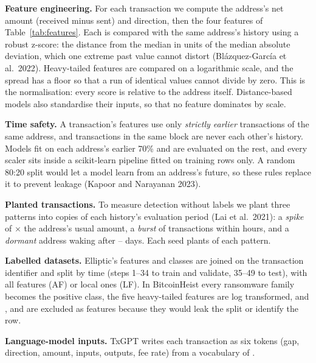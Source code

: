 \textbf{Feature engineering.} For each transaction we compute the address's net amount (received minus sent) and
direction, then the four features of Table~\ref{tab:features}. Each is compared with the same address's history
using a robust z-score: the distance from the median in units of the median absolute deviation, which one
extreme past value cannot distort (Blázquez-García et al.\ 2022). Heavy-tailed features are compared on a
logarithmic scale, and the spread has a floor so that a run of identical values cannot divide by zero. This is
the normalisation: every score is relative to the address itself. Distance-based models also standardise their
inputs, so that no feature dominates by scale.



\textbf{Time safety.} A transaction's features use only \emph{strictly earlier} transactions of the same address,
and transactions in the same block are never each other's history. Models fit on each address's earlier 70\% and
are evaluated on the rest, and every scaler sits inside a scikit-learn pipeline fitted on training rows only. A
random 80:20 split would let a model learn from an address's future, so these rules replace it to prevent leakage
(Kapoor and Narayanan 2023).

\textbf{Planted transactions.} To measure detection without labels we plant three patterns into copies of each
history's evaluation period (Lai et al.\ 2021): a \emph{spike} of $\times$ the address's usual amount,
a \emph{burst} of  transactions within  hours, and a \emph{dormant} address waking
after -- days. Each seed plants  of each pattern.

\textbf{Labelled datasets.} Elliptic's features and classes are joined on the transaction identifier and split by
time (steps 1--34 to train and validate, 35--49 to test), with all features (AF) or local ones (LF). In
BitcoinHeist every ransomware family becomes the positive class, the five heavy-tailed features are log
transformed, and ,  and  are excluded as features because they would leak the
split or identify the row.

\textbf{Language-model inputs.} TxGPT writes each transaction as six tokens (gap, direction, amount, inputs,
outputs, fee rate) from a vocabulary of .
